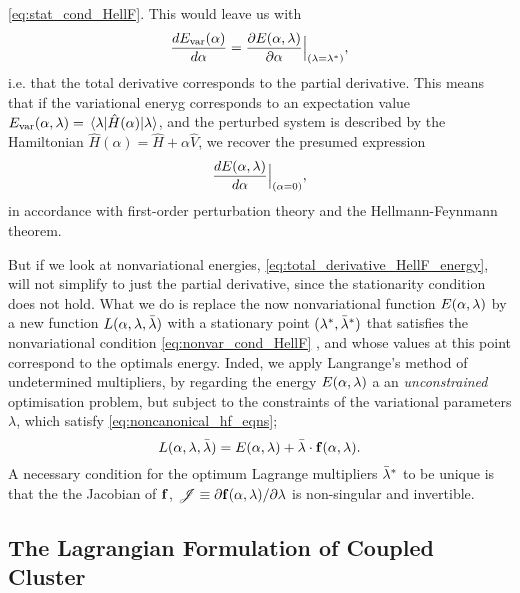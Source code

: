 \autoref{eq:stat_cond_HellF}. This would leave us with 
\begin{equation}
    \frac{d E_{\text{var}}(\alpha)}{d\alpha} 
    = \frac{\partial E(\alpha, \vb{\lambda})}{\partial\alpha}\Big\lvert_{(\vb{\lambda} = \vb{\lambda}^*)},
\end{equation}
i.e. that the total derivative corresponds to the partial derivative. This means that if the variational 
eneryg corresponds to an expectation value 
$E_{\text{var}}(\alpha, \vb{\lambda}) = \mel{\vb{\lambda}}{\hat{H}(\alpha)}{\vb{\lambda}}$, and the 
perturbed system is described by the Hamiltonian $\hat{H}(\alpha) = \hat{H} + \alpha\hat{V}$, we 
recover the presumed expression
\begin{equation}
\frac{dE(\alpha, \vb{\lambda})}{d\alpha}\Big\lvert_{(\alpha = 0)},
\end{equation}
in accordance with first-order perturbation theory and the Hellmann-Feynmann theorem.

But if we look at nonvariational energies, \autoref{eq:total_derivative_HellF_energy},
will not simplify to just the partial derivative, since the stationarity condition does not hold. 
What we do is replace the now nonvariational function $E(\alpha, \vb{\lambda})$ by a new function 
$L(\alpha, \vb{\lambda}, \bar{\vb{\lambda}})$ with a stationary point 
$(\vb{\lambda}^*, \bar{\vb{\lambda}}^*)$ that satisfies the nonvariational condition
\autoref{eq:nonvar_cond_HellF}
, and whose values at this point correspond to the optimals 
energy. Inded, we apply Langrange's method of undetermined multipliers, by regarding the 
energy $E(\alpha, \vb{\lambda})$ a an \emph{unconstrained} optimisation problem, but 
subject to the constraints of the variational parameters $\lambda$, which satisfy
\autoref{eq:noncanonical_hf_eqns};
\begin{equation}
    \label{eq:langrange_method}
    L(\alpha, \vb{\lambda}, \bar{\vb{\lambda}})
    = E(\alpha, \vb{\lambda}) + \bar{\vb{\lambda}} \cdot \vb{f}(\alpha, \vb{\lambda}).
\end{equation}
A necessary condition for the optimum Lagrange multipliers $\bar{\vb{\lambda}}^*$ to 
be unique is that the the Jacobian of $\vb{f}$, 
$\mathscr{J} \equiv \partial \vb{f}(\alpha, \vb{\lambda})/\partial \lambda$ is non-singular 
and invertible.

\subsection{The Lagrangian Formulation of Coupled Cluster}

